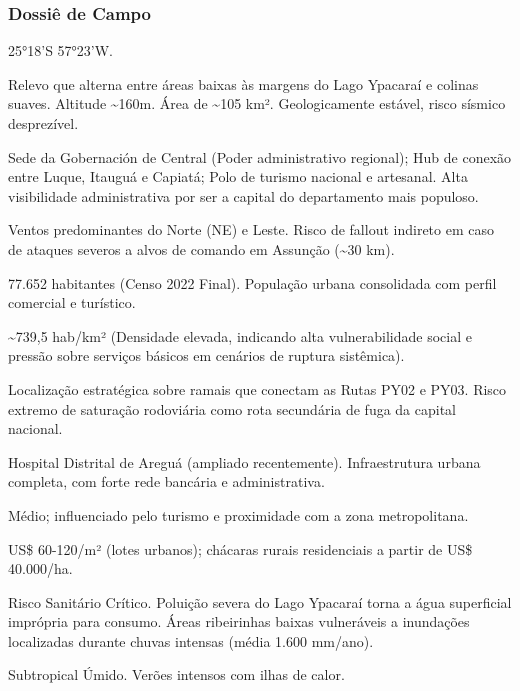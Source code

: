 \subsubsection{Dossiê de Campo}
\begin{description}[style=nextline,leftmargin=0.5cm,font=\bfseries]
\item[Coordenadas]  25°18'S 57°23'W.
\item[Topografia]  Relevo que alterna entre áreas baixas às margens do Lago Ypacaraí e colinas suaves. Altitude \textasciitilde 160m. Área de \textasciitilde 105 km². Geologicamente estável, risco sísmico desprezível.
\item[Alvos Estratégicos]  Sede da Gobernación de Central (Poder administrativo regional); Hub de conexão entre Luque, Itauguá e Capiatá; Polo de turismo nacional e artesanal. Alta visibilidade administrativa por ser a capital do departamento mais populoso.
\item[Fallout]  Ventos predominantes do Norte (NE) e Leste. Risco de fallout indireto em caso de ataques severos a alvos de comando em Assunção (\textasciitilde 30 km).
\item[População]  77.652 habitantes (Censo 2022 Final). População urbana consolidada com perfil comercial e turístico.
\item[Densidade]  \textasciitilde 739,5 hab/\allowbreak km² (Densidade elevada, indicando alta vulnerabilidade social e pressão sobre serviços básicos em cenários de ruptura sistêmica).
\item[Vias de Acesso]  Localização estratégica sobre ramais que conectam as Rutas PY02 e PY03. Risco extremo de saturação rodoviária como rota secundária de fuga da capital nacional.
\item[Serviços]  Hospital Distrital de Areguá (ampliado recentemente). Infraestrutura urbana completa, com forte rede bancária e administrativa.
\item[Custo de Vida]  Médio; influenciado pelo turismo e proximidade com a zona metropolitana.
\item[Preço da Terra]  US\$ 60-120/\allowbreak m² (lotes urbanos); chácaras rurais residenciais a partir de US\$ 40.000/\allowbreak ha.
\item[Hidrologia]  Risco Sanitário Crítico. Poluição severa do Lago Ypacaraí torna a água superficial imprópria para consumo. Áreas ribeirinhas baixas vulneráveis a inundações localizadas durante chuvas intensas (média 1.600 mm/\allowbreak ano).
\item[Clima]  Subtropical Úmido. Verões intensos com ilhas de calor.

\end{description}

